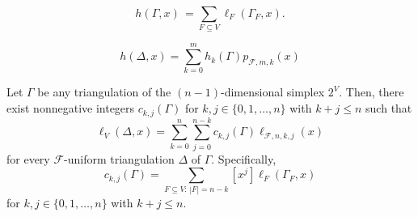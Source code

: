 \documentclass[10pt,a4paper]{amsart}
\newcommand{\fF}{{\mathcal F}}
\begin{document}
\begin{equation} \label{eq:h-localh}
  h (\Gamma, x) \, = \sum_{F \subseteq V} 
  \ell_F (\Gamma_F, x).
\end{equation}

\begin{equation} \label{eq:h-uniform}
h(\Delta,x) = \sum_{k=0}^m h_k(\Gamma)  
                        p_{\fF,m,k}(x) 
\end{equation}

\begin{theorem} \label{thm:uniform} 
Let $\Gamma$ be any triangulation of the 
$(n-1)$-dimensional simplex $2^V$. Then, there exist 
nonnegative integers $c_{k,j}(\Gamma)$ for $k, j \in 
\{0, 1,\dots,n\}$ with $k + j \le n$ such that 
%
\begin{equation} \label{eq:local-uniform}
\ell_V(\Delta,x) = \sum_{k=0}^n 
\sum_{j=0}^{n-k} c_{k,j}(\Gamma) \ell_{\fF,n,k,j}(x)
\end{equation}
%
for every $\fF$-uniform triangulation $\Delta$ of 
$\Gamma$. Specifically,
%
\begin{equation} \label{eq:ckj}
c_{k,j}(\Gamma) = \sum_{F \subseteq V: \, |F|=n-k} 
                  [x^j] \ell_F(\Gamma_F,x) 
\end{equation}
%
for $k, j \in \{0, 1,\dots,n\}$ with $k + j \le n$.
\end{theorem}
\end{document}
